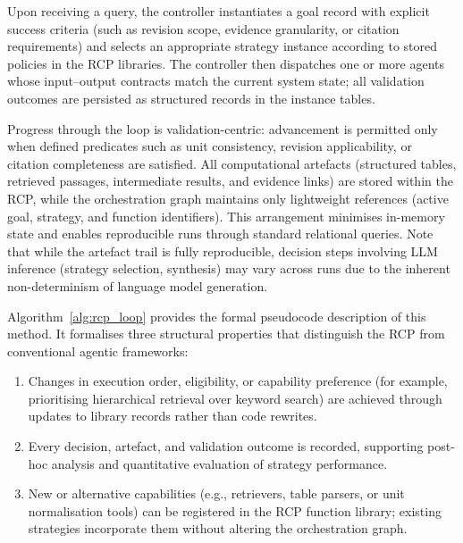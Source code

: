 \documentclass[largeformat]{interact}
\begin{document}
Upon receiving a query, the controller instantiates a goal record with explicit success criteria (such as revision scope, evidence granularity, or citation requirements) and selects an appropriate strategy instance according to stored policies in the RCP libraries. The controller then dispatches one or more agents whose input--output contracts match the current system state; all validation outcomes are persisted as structured records in the instance tables.


Progress through the loop is validation-centric: advancement is permitted only when defined predicates such as unit consistency, revision applicability, or citation completeness are satisfied. All computational artefacts (structured tables, retrieved passages, intermediate results, and evidence links) are stored within the RCP, while the orchestration graph maintains only lightweight references (active goal, strategy, and function identifiers). This arrangement minimises in-memory state and enables reproducible runs through standard relational queries. Note that while the artefact trail is fully reproducible, decision steps involving LLM inference (strategy selection, synthesis) may vary across runs due to the inherent non-determinism of language model generation.

Algorithm~\ref{alg:rcp_loop} provides the formal pseudocode description of this method. It formalises three structural properties that distinguish the RCP from conventional agentic frameworks:
\begin{enumerate}
    \item {} Changes in execution order, eligibility, or capability preference (for example, prioritising hierarchical retrieval over keyword search) are achieved through updates to library records rather than code rewrites.
    \item {} Every decision, artefact, and validation outcome is recorded, supporting post-hoc analysis and quantitative evaluation of strategy performance.
    \item {} New or alternative capabilities (e.g., retrievers, table parsers, or unit normalisation tools) can be registered in the RCP function library; existing strategies incorporate them without altering the orchestration graph.
\end{enumerate}



\end{document}

